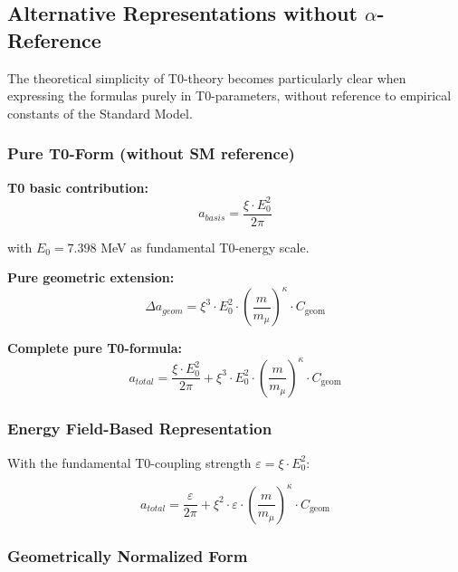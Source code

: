 \documentclass[12pt,a4paper]{article}
\numberwithin{equation}{section}
\newcommand{\xipar}{\xi}
\newcommand{\Cgeom}{C_{\text{geom}}}
\newcommand{\kappaT}{\kappa}
\newcommand{\mmu}{m_{\mu}}
\begin{document}
	\subsection{Alternative Representations without $\alpha$-Reference}
	
	The theoretical simplicity of T0-theory becomes particularly clear when expressing the formulas purely in T0-parameters, without reference to empirical constants of the Standard Model.
	
	\subsubsection{Pure T0-Form (without SM reference)}
	
	\textbf{T0 basic contribution:}
	\begin{equation}
		a_{basis} = \frac{\xipar \cdot E_0^2}{2\pi}
	\end{equation}
	
	with $E_0 = 7.398$ MeV as fundamental T0-energy scale.
	
	\textbf{Pure geometric extension:}
	\begin{equation}
		\Delta a_{geom} = \xipar^3 \cdot E_0^2 \cdot \left(\frac{m}{\mmu}\right)^\kappaT \cdot \Cgeom
	\end{equation}
	
	\textbf{Complete pure T0-formula:}
	\begin{equation}
		\boxed{a_{total} = \frac{\xipar \cdot E_0^2}{2\pi} + \xipar^3 \cdot E_0^2 \cdot \left(\frac{m}{\mmu}\right)^\kappaT \cdot \Cgeom}
	\end{equation}
	
	\subsubsection{Energy Field-Based Representation}
	
	With the fundamental T0-coupling strength $\varepsilon = \xipar \cdot E_0^2$:
	
	\begin{equation}
		\boxed{a_{total} = \frac{\varepsilon}{2\pi} + \xipar^2 \cdot \varepsilon \cdot \left(\frac{m}{\mmu}\right)^\kappaT \cdot \Cgeom}
	\end{equation}
	
	\subsubsection{Geometrically Normalized Form}
	
\end{document}
